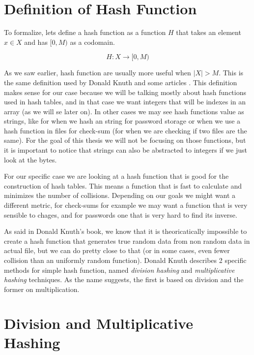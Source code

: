 \bigskip

\section{Definition of Hash Function}

To formalize, lets define a hash function as a function \( H \) that takes an element \( x \in X \) and has \( [0, M) \) as a codomain.

\[ H: X \rightarrow [0, M) \]

As we saw earlier, hash function are usually more useful when \( |X| > M \). This is the same definition used by Donald Knuth \cite{TAOCP3} and some articles \cite{RobinHoodHashing}. This definition makes sense for our case because we will be talking mostly about hash functions used in hash tables, and in that case we want integers that will be indexes in an array (as we will se later on). In other cases we may see hash functions value as strings, like for when we hash an string for password storage or when we use a hash function in files for check-sum (for when we are checking if two files are the same). For the goal of this thesis we will not be focusing on those functions, but it is important to notice that strings can also be abstracted to integers if we just look at the bytes.

For our specific case we are looking at a hash function that is good for the construction of hash tables. This means a function that is fast to calculate and minimizes the number of collisions. Depending on our goals we might want a different metric, for check-sums for example we may want a function that is very sensible to chages, and for passwords one that is very hard to find its inverse.

As said in Donald Knuth's book, we know that it is theoricatically impossible to create a hash function that generates true random data from non random data in actual file, but we can do pretty close to that (or in some cases, even fewer collision than an uniformly random function).  Donald Knuth describes 2 specific methods for simple hash function, named \textit{division hashing} and \textit{multiplicative hashing} techniques. As the name suggests, the first is based on division and the former on multiplication.

\section{Division and Multiplicative Hashing}

